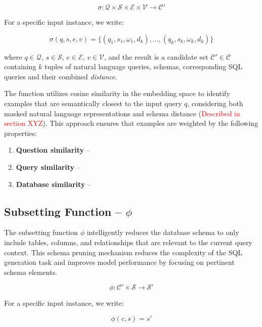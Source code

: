 $$
\sigma: \mathcal{Q} \times \mathcal{S} \times \mathcal{E} \times \mathcal{V} \rightarrow \mathcal{C}'
$$

\vspace{0.5em}

For a specific input instance, we write:

$$
\sigma(q, s, e, v) = \{(q_1, s_1, \omega_1, d_k), ..., (q_k, s_k, \omega_k, d_k)\}
$$

\vspace{0.5em}

where $q \in \mathcal{Q}$, $s \in \mathcal{S}$, $e \in \mathcal{E}$, $v \in \mathcal{V}$,
and the result is a candidate set $\mathcal{C}' \in \mathcal{C}$ containing $k$ tuples of
natural language queries, schemas, corresponding SQL queries and their combined \textit{distance}.

The function utilizes cosine similarity in the embedding space to identify examples
that are semantically closest to the input query $q$, considering both masked natural
language representations and schema distance (\textcolor{red}{Described in section XYZ}).
This approach ensures that examples are weighted by the following properties:

\begin{enumerate}
    \item \textbf{Question similarity} – 
    \item \textbf{Query similarity} –
    \item \textbf{Database similarity} –
\end{enumerate}


\subsection{Subsetting Function – $\phi$}

The subsetting function $\phi$ intelligently reduces the database schema to only include
tables, columns, and relationships that are relevant to the current query context.
This schema pruning mechanism reduces the complexity of the SQL generation task and
improves model performance by focusing on pertinent schema elements.

$$
\phi: \mathcal{C}' \times \mathcal{S} \rightarrow \mathcal{S}'
$$

\vspace{0.5em}

For a specific input instance, we write:

$$
\phi(c, s) = s'
$$

